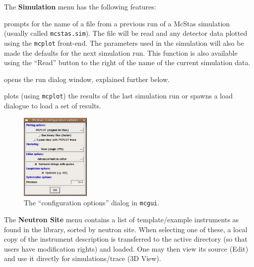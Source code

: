 \noindent The {\bf Simulation} menu has the following features:
\begin{description} 
\item[Simulation/Read old simulation] prompts for the name of a file
  from a previous run of a McStas simulation (usually called
  \verb+mcstas.sim+). The file will be read and any detector data
  plotted using the \verb+mcplot+ front-end. The parameters used in the
  simulation will also be made the defaults for the next simulation
  run. This function is also available using the ``Read'' button to the
  right of the name of the current simulation data.
\item[Simulation/Run simulation] opens the run dialog window, explained
  further below.
\item[Simulation/Plot results] plots (using \verb+mcplot+) the results of the
  last simulation run or spawns a load dialogue to load a set of results.
\end{description}


\begin{figure}[htb!]
  \begin{center}
    \includegraphics[width=0.3\textwidth]{figures/choose_backend}
  \end{center}
\caption{The ``configuration options'' dialog in \texttt{mcgui}.}
\label{fig:mcgui-choose}
\end{figure}


\noindent The {\bf Neutron Site} menu contains a list of template/example
instruments as found in the \MCS library, sorted by neutron site. When
selecting one of these, a local copy of the instrument description is
transferred to the active directory (so that users have modification rights) and
loaded. One may then view its source (Edit) and use it directly for
simulations/trace (3D View).
\\\ \\

